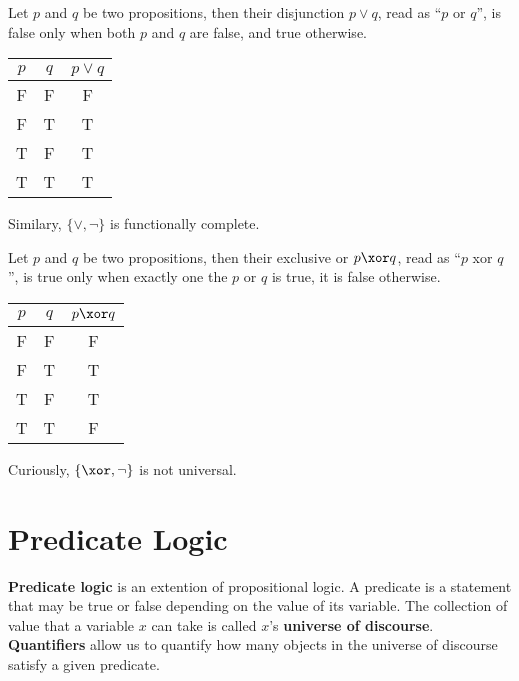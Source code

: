 \begin{definition}[Disjunction]
    Let \(p\) and \(q\) be two propositions, then their disjunction \(p \lor q\), read as ``\(p\) or \(q\)'', is false only when both \(p\) and \(q\) are false, and true otherwise.
    \begin{center}
        \begin{tabular}[c]{c  c | c}
            \(p\) & \(q\) & \(p \lor q\) \\ \hline
            F     & F     & F            \\
            F     & T     & T            \\
            T     & F     & T            \\
            T     & T     & T            \\
        \end{tabular}
    \end{center}
\end{definition}

Similary, \(\{\lor, \neg\}\) is functionally complete.

\begin{definition}[Exclusive or]
    Let \(p\) and \(q\) be two propositions, then their exclusive or \(p \xor q\), read as ``\(p\) xor \(q\)'', is true only when exactly one the \(p\) or \(q\) is true, it is false otherwise.
    \begin{center}
        \begin{tabular}[c]{c  c | c}
            \(p\) & \(q\) & \(p \xor q\) \\ \hline
            F     & F     & F            \\
            F     & T     & T            \\
            T     & F     & T            \\
            T     & T     & F            \\
        \end{tabular}
    \end{center}
\end{definition}

Curiously, \(\{\xor, \neg\}\) is not universal.

\section{Predicate Logic}
\textbf{Predicate logic} is an extention of propositional logic. A predicate is a statement that may be true or false depending on the value of its variable.
The collection of value that a variable \(x\) can take is called \(x\)'s \textbf{universe of discourse}.
\textbf{Quantifiers} allow us to quantify how many objects in the universe of discourse satisfy a given predicate.

